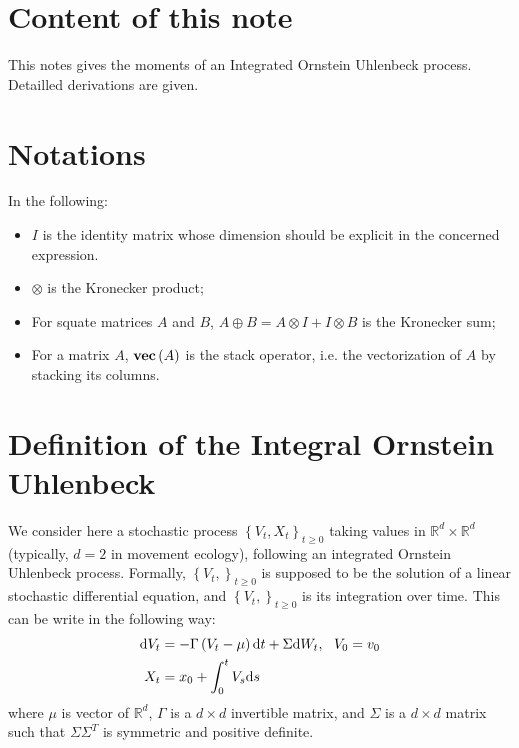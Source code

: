 




\section*{Content of this note}

This notes gives the moments of an Integrated Ornstein Uhlenbeck process. 
Detailled derivations are given.

\section*{Notations}
In the following:
\begin{itemize}
\item $I$ is the identity matrix whose dimension should be explicit in the concerned expression.
\item $\otimes$ is the Kronecker product;
\item For squate matrices $A$ and $B$, $A \oplus B = A\otimes I + I \otimes B$ is the Kronecker sum;
\item For a matrix $A$, $\textbf{vec}\left(A \right)$ is the stack operator, i.e. the vectorization of $A$ by stacking its columns.
\end{itemize}

\section{Definition of the Integral Ornstein Uhlenbeck}
We consider here a stochastic process $\left\lbrace V_t, X_t \right\rbrace_{t \geq 0}$ taking values in $\mathbb{R}^{d}\times \mathbb{R}^{d}$ (typically, $d = 2$ in movement ecology), following an integrated Ornstein Uhlenbeck process.
Formally, $\left\lbrace V_t, \right\rbrace_{t \geq 0}$ is supposed to be the solution of a linear stochastic differential equation, and $\left\lbrace V_t, \right\rbrace_{t \geq 0}$ is its integration over time.
This can be write in the following way: 
\begin{align}
\text{d} V_t &= -\Gamma \left( V_t - \mu \right)\text{d} t + \Sigma \text{d} W_t,~~V_0 = v_0\label{eq:OU:append}\\
X_t &= x_0 + \int_0^t V_s \text{d} s\label{eq:IOU:append}
\end{align}
where $\mu$ is vector of $\mathbb{R}^d$, $\Gamma$ is a $d \times d$ invertible matrix, and $\Sigma$ is a $d \times d$ matrix such that $\Sigma\Sigma^T$ is symmetric and positive definite.

